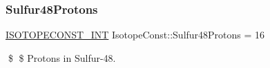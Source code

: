 \subsubsection{\texorpdfstring{Sulfur48\+Protons}{Sulfur48Protons}}
{\footnotesize\ttfamily \mbox{\hyperlink{group___isotope_const-_macros_ga5f18360b3e99483a35c32d789e62621c}{I\+S\+O\+T\+O\+P\+E\+C\+O\+N\+S\+T\+\_\+\+I\+NT}} Isotope\+Const\+::\+Sulfur48\+Protons = 16}

\$ \$ Protons in Sulfur-\/48. 